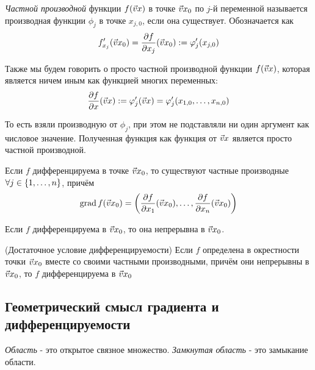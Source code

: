\begin{multicols}{2}
    \begin{definition}{}{}
        \textit{Частной производной} функции $f(\vec{v}{x})$ в точке $\vec{v}{x}_0$ по $j$-й переменной называется производная функции $\phi_j$ в точке $x_{j, 0}$, если она существует. Обозначается как 
        \[
            f'_{x_j}(\vec{v}{x}_0) = \frac{\partial f}{\partial x_j} (\vec{v}{x}_0) := \varphi'_j (x_{j, 0})
        \]
    \end{definition}
    
    \begin{definition}{}{}
        Также мы будем говорить о просто частной производной функции $f(\vec{v}{x})$, которая является ничем иным как функцией многих переменных:
        \[
            \frac{\partial f}{\partial x} (\vec{v}{x}) := \varphi'_j(\vec{v}{x}) = \varphi'_j (x_{1, 0}, \ldots, x_{n, 0})
        \]
    \end{definition}
    
    \begin{note}{}{}
        То есть взяли производную от $\phi_j$, при этом не подставляли ни один аргумент как числовое значение. Полученная функция как функция от $\vec{v}{x}$ является просто частной производной.
    \end{note}
    
    \begin{theorema}{}{}
        Если $f$ дифференцируема в точке $\vec{v}{x}_0$, то существуют частные производные $\forall j \in \{1, \ldots, n\}$, причём
        \[
            \operatorname{grad} f(\vec{v}{x}_0) = \left(\frac{\partial f}{\partial x_1}(\vec{v}{x}_0), \ldots, \frac{\partial f}{\partial x_n}(\vec{v}{x}_0)\right)
        \]
    \end{theorema}
    
    \begin{theorema}{}{}
        Если $f$ дифференцируема в $\vec{v}{x}_0$, то она непрерывна в $\vec{v}{x}_0$.
    \end{theorema}
    
    
    \begin{theorema}{(Достаточное условие дифференцируемости)}{}
        Если $f$ определена в окрестности точки $\vec{v}{x}_0$ вместе со своими частными производными, причём они непрерывны в $\vec{v}{x}_0$, то $f$ дифференцируема в $\vec{v}{x}_0$
    \end{theorema}
    \subsection*{Геометрический смысл градиента и дифференцируемости}

\begin{definition}
	\textit{Область} - это открытое связное множество. \textit{Замкнутая область} - это замыкание области.
\end{definition}


\end{multicols}
